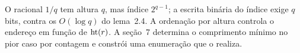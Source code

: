 O racional $1/q$ tem altura $q$, mas índice $2^{q-1}$; a escrita binária do índice exige $q$ bits, contra os $O(\log q)$ do lema~2.4. A ordenação por altura controla o endereço em função de $\operatorname{ht}(r)$. A seção~7 determina o comprimento mínimo no pior caso por contagem e constrói uma enumeração que o realiza.
